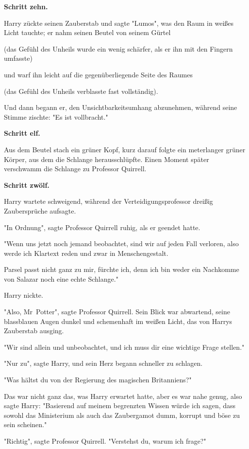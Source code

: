 {\textbf{Schritt zehn.}

Harry zückte seinen Zauberstab und sagte "Lumos", was den Raum in weißes Licht tauchte; er nahm seinen Beutel von seinem Gürtel

(das Gefühl des Unheils wurde ein wenig schärfer, als er ihn mit den Fingern umfasste)

und warf ihn leicht auf die gegenüberliegende Seite des Raumes

(das Gefühl des Unheils verblasste fast vollständig).

Und dann begann er, den Unsichtbarkeitsumhang abzunehmen, während seine Stimme zischte: "Es ist vollbracht."

\textbf{Schritt elf.}

Aus dem Beutel stach ein grüner Kopf, kurz darauf folgte ein meterlanger grüner Körper, aus dem die Schlange herausschlüpfte. Einen Moment später verschwamm die Schlange zu Professor Quirrell.

\textbf{Schritt zwölf.}

Harry wartete schweigend, während der Verteidigungsprofessor dreißig Zaubersprüche aufsagte.

"In Ordnung", sagte Professor Quirrell ruhig, als er geendet hatte.

"Wenn uns jetzt noch jemand beobachtet, sind wir auf jeden Fall verloren, also werde ich Klartext reden und zwar in Menschengestalt.

Parsel passt nicht ganz zu mir, fürchte ich, denn ich bin weder ein Nachkomme von Salazar noch eine echte Schlange."

Harry nickte.

"Also, Mr~Potter", sagte Professor Quirrell. Sein Blick war abwartend, seine blassblauen Augen dunkel und schemenhaft im weißen Licht, das von Harrys Zauberstab ausging.

"Wir sind allein und unbeobachtet, und ich muss dir eine wichtige Frage stellen."

"Nur zu", sagte Harry, und sein Herz begann schneller zu schlagen.

"Was hältst du von der Regierung des magischen Britanniens?"

Das war nicht ganz das, was Harry erwartet hatte, aber es war nahe genug, also sagte Harry: "Basierend auf meinem begrenzten Wissen würde ich sagen, dass sowohl das Ministerium als auch das Zaubergamot dumm, korrupt und böse zu sein scheinen."

"Richtig", sagte Professor Quirrell. "Verstehst du, warum ich frage?"

}
